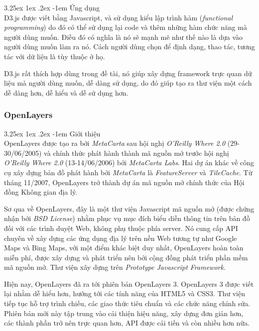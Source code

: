 \documentclass[12pt,a4paper,twoside]{article}
\makeatletter
\newcommand{\myparagraph}[1]{\paragraph{#1}\mbox{}\\} %
\renewcommand\paragraph{\@startsection{paragraph}{5}{\z@}%
  {3.25ex \@plus1ex \@minus.2ex}%
  {-1em}%
  {\normalfont\normalsize\bfseries}}
\makeatother
\begin{document}
\myparagraph{Ứng dụng}
D3.js được viết bằng Javascript, và sử dụng kiểu lập trình hàm (\textit{functional programming}) do đó có thể sử dụng lại code và thêm những hàm chức năng mà người dùng muốn. Điều đó có nghĩa là nó sẽ mạnh mẽ như thế nào là dựa vào người dùng muốn làm ra nó. Cách người dùng chọn để định dạng, thao tác, tương tác với dữ liệu là tùy thuộc ở họ.

D3.js rất thích hợp dùng trong đề tài, nó giúp xây dựng framework trực quan dữ liệu mà người dùng muốn, dễ dàng sử dụng, do đó giúp tạo ra thư viện một cách dễ dàng hơn, dễ hiểu và dễ sử dụng hơn.

\subsubsection{OpenLayers}
\myparagraph{Giới thiệu}
OpenLayers\cite{ol} được tạo ra bởi \textit{MetaCarta} sau hội nghị \textit{O'Reilly Where 2.0} (29-30/06/2005) và chính thức phát hành thành mã nguồn mở trước hội nghị  \textit{O'Reilly Where 2.0} (13-14/06/2006) bởi \textit{MetaCarta Labs}. Hai dự án khác về công cụ xây dựng bản đồ phát hành bởi \textit{MetaCarta} là \textit{FeatureServer} và \textit{TileCache}. Từ tháng 11/2007, OpenLayers trở thành dự án mã nguồn mở chính thức của Hội đồng Không gian địa lý.

Sơ qua về OpenLayers, đây là một thư viện Javascript mã nguồn mở (được chứng nhận bởi \textit{BSD License}) nhằm phục vụ mục đích biểu diễn thông tin trên bản đồ  đối với các trình duyệt Web, không phụ thuộc phía server. Nó cung cấp API chuyên về xây dựng các ứng dụng địa lý trên nền Web tương tự như Google Maps và Bing Maps, với một điểm khác biệt duy nhất, OpenLayers hoàn toàn miễn phí, được xây dựng và phát triển nên bởi cộng đồng phát triển phần mềm mã nguồn mở. Thư viện xây dựng trên \textit{Prototype Javascript Framework}\citep{prototypejs}.

Hiện nay, OpenLayers đã ra tới phiên bản OpenLayers 3. OpenLayers 3 được viết lại nhằm dễ hiểu hơn, hướng tới các tính năng của HTML5 và CSS3. Thư viện tiếp tục hỗ trợ trình chiếu, các giao thức tiêu chuẩn và các chức năng chỉnh sửa. Phiên bản mới này tập trung vào cải thiện hiệu năng, xây dựng đơn giản hơn, các thành phần trở nên trực quan hơn, API được cải tiến và còn nhiều hơn nữa.
\end{document}
